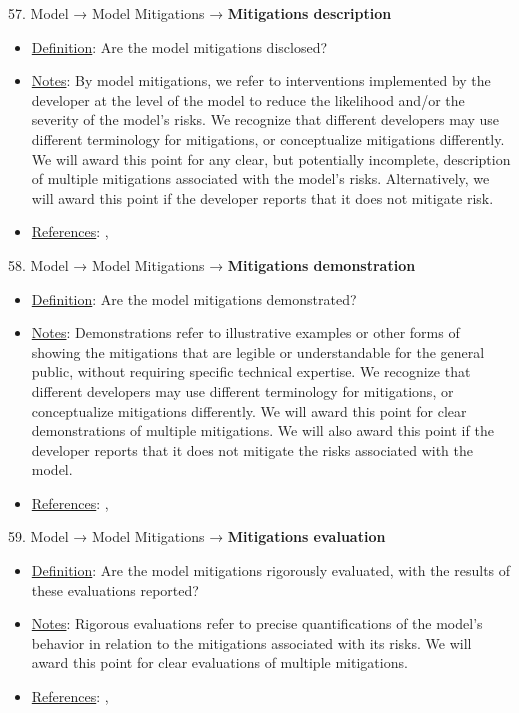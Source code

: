 57. Model → Model Mitigations → \textbf{Mitigations description}
\vspace{-\parskip}
\begin{itemize}
	\item
	\underline{Definition}: Are the model mitigations disclosed?
	\item
	\underline{Notes}: By model mitigations, we refer to interventions implemented by the developer at the level of the model to reduce the likelihood and/or the severity of the model’s risks. We recognize that different developers may use different terminology for mitigations, or conceptualize mitigations differently. We will award this point for any clear, but potentially incomplete, description of multiple mitigations associated with the model's risks. Alternatively, we will award this point if the developer reports that it does not mitigate risk.
	\item
	\underline{References}: \citet{solaiman2023evaluating}, \citet{weidinger2021ethical}
\end{itemize} \vspace{\baselineskip}


58. Model → Model Mitigations → \textbf{Mitigations demonstration}
\vspace{-\parskip}
\begin{itemize}
	\item
	\underline{Definition}: Are the model mitigations demonstrated?
	\item
	\underline{Notes}: Demonstrations refer to illustrative examples or other forms of showing the mitigations that are legible or understandable for the general public, without requiring specific technical expertise. We recognize that different developers may use different terminology for mitigations, or conceptualize mitigations differently. We will award this point for clear demonstrations of multiple mitigations. We will also award this point if the developer reports that it does not mitigate the risks associated with the model.
	\item
	\underline{References}: \citet{solaiman2023evaluating}, \citet{weidinger2021ethical}
\end{itemize} \vspace{\baselineskip}


59. Model → Model Mitigations → \textbf{Mitigations evaluation}
\vspace{-\parskip}
\begin{itemize}
	\item
	\underline{Definition}: Are the model mitigations rigorously evaluated, with the results of these evaluations reported?
	\item
	\underline{Notes}: Rigorous evaluations refer to precise quantifications of the model's behavior in relation to the mitigations associated with its risks. We will award this point for clear evaluations of multiple mitigations.
	\item
	\underline{References}: \citet{huang2023catastrophic}, \citet{weidinger2021ethical}
\end{itemize} \vspace{\baselineskip}


